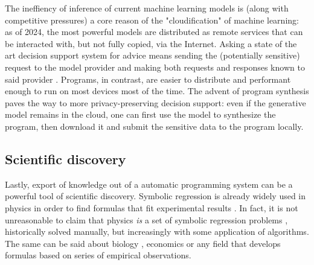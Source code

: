 The ineffiency of inference of current machine learning models is (along with competitive pressures) a core reason of the "cloudification" of machine learning: as of 2024, the most powerful models \cite{achiamGpt4TechnicalReport2023} are distributed as remote services that can be interacted with, but not fully copied, via the Internet.
Asking a state of the art decision support system for advice means sending the (potentially sensitive) request to the model provider and making both requests and responses known to said provider \cite{PrivacyPolicy}.
Programs, in contrast, are easier to distribute and performant enough to run on most devices most of the time.
The advent of program synthesis paves the way to more privacy-preserving decision support: even if the generative model remains in the cloud, one can first use the model to synthesize the program, then download it and submit the sensitive data to the program locally.

\subsection{Scientific discovery}

Lastly, export of knowledge out of a automatic programming system can be a powerful tool of scientific discovery. 
Symbolic regression is already widely used in physics in order to find formulas that fit experimental results \cite{angelisArtificialIntelligencePhysical2023, tenachiDeepSymbolicRegression2023}. 
In fact, it is not unreasonable to claim that physics \emph{is} a set of symbolic regression problems \cite{udrescuAIFeynmanPhysicsinspired2020}, historically solved manually, but increasingly with some application of algorithms. 
The same can be said about biology \cite{chenRevealingComplexEcological2019}, economics \cite{claveriaAssessmentEffectFinancial2017, lianModelingForecastingPassenger2018, panInfluentialFactorsCarbon2019, truscottDetectingShadowEconomy2011, truscottExplainingUnemploymentRates2014, yamashitaCustomizedPredictionAttendance2022} or any field that develops formulas based on series of empirical observations.
